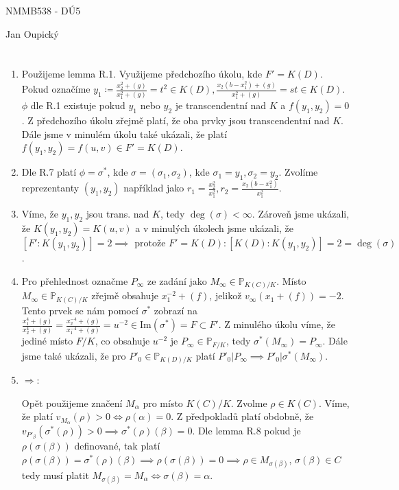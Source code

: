 \documentclass[12pt, a4paper]{article}
\begin{document}
\begin{center}
\large NMMB538 - DÚ5

\normalsize Jan Oupický
\end{center}
\vspace{1\baselineskip}

\section{}
\begin{enumerate}
    \item Použijeme lemma R.1. Využijeme předchozího úkolu, kde $F' = K(D)$. Pokud označíme $y_1 \coloneqq \frac{x_2^2 + (g)}{x_1^2 + (g)} = t^2 \in K(D),\frac{x_2(b-x_1^2) + (g)}{x_1^2 + (g)} = st \in K(D)$. $\phi$ dle R.1 existuje pokud $y_1$ nebo $y_2$ je transcendentní nad $K$ a $f(y_1,y_2)=0$. Z předchozího úkolu zřejmě platí, že oba prvky jsou transcendentní nad $K$. Dále jsme v minulém úkolu také ukázali, že platí $f(y_1,y_2)=f(u,v) \in F' = K(D)$.

    \item Dle R.7 platí $\phi = \sigma^*$, kde $\sigma=(\sigma_1, \sigma_2)$, kde $\sigma_1 = y_1, \sigma_2 = y_2$. Zvolíme reprezentanty $(y_1,y_2)$ například jako $r_1 = \frac{x_2^2}{x_1^2}, r_2 = \frac{x_2(b-x_1^2)}{x_1^2}$. 

    \item Víme, že $y_1,y_2$ jsou trans. nad $K$, tedy $\deg(\sigma) < \infty$. Zároveň jsme ukázali, že $K(y_1,y_2)=K(u,v)$ a v minulých úkolech jsme ukázali, že $[F':K(y_1,y_2)] = 2 \implies \text{ protože }F'=K(D): [K(D):K(y_1,y_2)]=2=\deg(\sigma)$.

    \item Pro přehlednost označme $P_\infty$ ze zadání jako $M_\infty \in \mathbb{P}_{K(C)/K}$. Místo $M_\infty \in \mathbb{P}_{K(C)/K}$ zřejmě obsahuje $x_1^{-2}+(f)$, jelikož $v_{\infty}(x_1+(f))=-2$. Tento prvek se nám pomocí $\sigma^*$ zobrazí na $\frac{x_1^4+(g)}{x_2^4+(g)} = \frac{x_2^{-4}+(g)}{x_1^{-4}+(g)} = u^{-2} \in \text{Im}(\sigma^*) = F \subset F'$. Z minulého úkolu víme, že jediné místo $F/K$, co obsahuje $u^{-2}$ je $P_\infty \in \mathbb{P}_{F/K}$, tedy $\sigma^*(M_\infty)=P_\infty$. Dále jsme také ukázali, že pro $P'_0 \in \mathbb{P}_{K(D)/K}$ platí $P'_0 | P_\infty \implies P'_0 | \sigma^*(M_\infty)$.

    \item $\Rightarrow$:

    Opět použijeme značení $M_\alpha$ pro místo $K(C)/K$. Zvolme $\rho \in K(C)$. Víme, že platí $v_{M_\alpha}(\rho) > 0 \iff \rho(\alpha) = 0$. Z předpokladů platí obdobně, že $v_{P'_\beta}(\sigma^*(\rho)) > 0 \implies \sigma^*(\rho)(\beta) = 0$. Dle lemma R.8 pokud je $\rho(\sigma(\beta))$ definované, tak platí $\rho(\sigma(\beta))=\sigma^*(\rho)(\beta) \implies\rho(\sigma(\beta)) = 0 \implies \rho \in M_{\sigma(\beta)}$, $\sigma(\beta) \in C$ tedy musí platit $M_{\sigma(\beta)} = M_\alpha \iff \sigma(\beta) = \alpha$. 


\end{enumerate}
\end{document}
